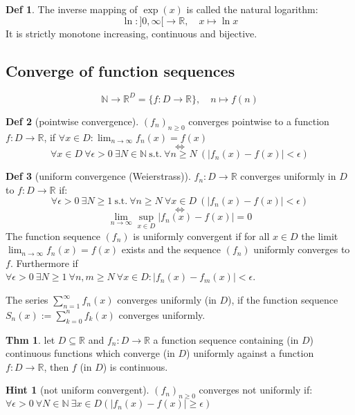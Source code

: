 \documentclass[a4paper, 10pt]{article}
\theoremstyle{definition}
\newtheorem*{theorem}{Thm}
\newtheorem*{definition}{Def}
\newtheorem*{note_wrapper}{Hint}
\theoremstyle{ex}
\theoremstyle{named}
\newenvironment{note}%
    {\begin{mdframed}[style=trick]\begin{note_wrapper}}%
    {\end{note_wrapper}\end{mdframed}}
\newcommand{\R}{\mathbb{R}}
\newcommand{\N}{\mathbb{N}}
\begin{document}
\begin{definition}
    The inverse mapping of $\exp (x)$ is called the natural logarithm: 
    $$\ln : ]0, \infty [ \to \R, \quad x \mapsto \ln x$$
    It is strictly monotone increasing, continuous and bijective.
\end{definition}

\subsection{Converge of function sequences}
$$\N \to \R^D = \{f: D \to \R\}, \quad n \mapsto f(n)$$
\begin{definition} [pointwise convergence]
    $(f_n)_{n \geq 0}$ converges pointwise to a function $f: D \to \R$, if $\forall x \in D : \lim_{n \to \infty} f_n(x) = f(x)$
    $$\iff$$
    $$\forall x \in D \ \forall \epsilon > 0 \ \exists N \in \N \ \text{s.t.} \ \forall n \geq N \ (|f_n(x) - f(x)| < \epsilon)$$
\end{definition}

\begin{definition}[uniform convergence (Weierstrass)]
    $f_n: D \to \R$ converges uniformly in $D$ to $f: D \to \R$ if: 
    $$\forall \epsilon > 0 \ \exists N \geq 1 \ \text{s.t.} \ \forall n \geq N \ \forall x \in D \ (|f_n(x) - f(x)| < \epsilon)$$
    $$\iff$$
    $$\lim_{n\to\infty} \sup_{x \in D} |f_n(x) - f(x)| = 0$$
    The function sequence $(f_n)$ is uniformly convergent if for all
    $x \in D$ the limit $\lim_{n\to\infty} f_n(x) = f(x)$ exists and the sequence $(f_n)$ uniformly converges to $f$. Furthermore if \\
    $\forall \epsilon > 0 \ \exists N \geq 1 \ \forall n, m \geq N \ \forall x \in D: |f_n(x) - f_m(x)| < \epsilon$.

    The series $\sum_{n = 1}^\infty f_n(x)$ converges uniformly (in $D$), if the function sequence $S_n(x) := \sum_{k=0}^n f_k(x)$ converges uniformly.
\end{definition}

\begin{theorem}
    let $D \subseteq \R$ and $f_n: D \to \R$ a function sequence containing (in $D$) continuous functions which converge (in $D$) uniformly against a function $f: D \to \R$, then $f$ (in $D$) is continuous.
\end{theorem}

\begin{note}[not uniform convergent] $(f_n)_{n \geq 0}$ converges not uniformly if:
    $\forall \epsilon > 0 \ \forall N \in \N \ \exists x \in D (|f_n(x) - f(x)| \geq \epsilon)$
\end{note}
\end{document}
